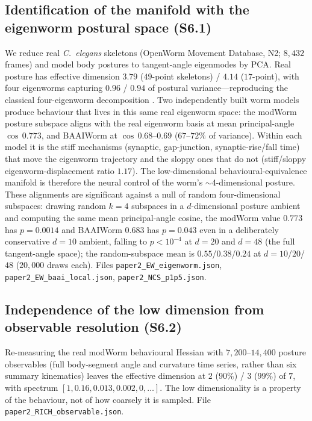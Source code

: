 \documentclass[11pt]{article}
\begin{document}
\subsection{Identification of the manifold with the eigenworm postural space (S6.1)}
We reduce real \emph{C.~elegans} skeletons (OpenWorm Movement Database, N2; $8{,}432$ frames) and model body postures to tangent-angle eigenmodes by PCA. Real posture has effective dimension $3.79$ ($49$-point skeletons) / $4.14$ ($17$-point), with four eigenworms capturing $0.96$ / $0.94$ of postural variance---reproducing the classical four-eigenworm decomposition \citep{stephens2008dimensionality}. Two independently built worm models produce behaviour that lives in this same real eigenworm space: the modWorm posture subspace aligns with the real eigenworm basis at mean principal-angle $\cos\,0.773$, and BAAIWorm at $\cos\,0.68$--$0.69$ ($67$--$72\%$ of variance). Within each model it is the stiff mechanisms (synaptic, gap-junction, synaptic-rise/fall time) that move the eigenworm trajectory and the sloppy ones that do not (stiff/sloppy eigenworm-displacement ratio $1.17$). The low-dimensional behavioural-equivalence manifold is therefore the neural control of the worm's $\sim$4-dimensional posture. These alignments are significant against a null of random four-dimensional subspaces: drawing random $k{=}4$ subspaces in a $d$-dimensional posture ambient and computing the same mean principal-angle cosine, the modWorm value $0.773$ has $p{=}0.0014$ and BAAIWorm $0.683$ has $p{=}0.043$ even in a deliberately conservative $d{=}10$ ambient, falling to $p{<}10^{-4}$ at $d{=}20$ and $d{=}48$ (the full tangent-angle space); the random-subspace mean is $0.55$/$0.38$/$0.24$ at $d{=}10$/$20$/$48$ ($20{,}000$ draws each). Files \texttt{paper2\_EW\_eigenworm.json}, \texttt{paper2\_EW\_baai\_local.json}, \texttt{paper2\_NCS\_p1p5.json}.

\subsection{Independence of the low dimension from observable resolution (S6.2)}
Re-measuring the real modWorm behavioural Hessian with $7{,}200$--$14{,}400$ posture observables (full body-segment angle and curvature time series, rather than six summary kinematics) leaves the effective dimension at $2$ ($90\%$) / $3$ ($99\%$) of $7$, with spectrum $[1,0.16,0.013,0.002,0,\dots]$. The low dimensionality is a property of the behaviour, not of how coarsely it is sampled. File \texttt{paper2\_RICH\_observable.json}.
\end{document}
